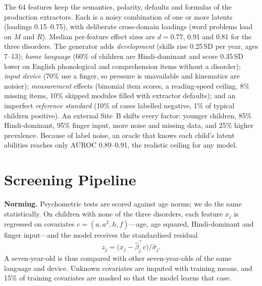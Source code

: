 \documentclass[conference]{IEEEtran}
\begin{document}
The 64 features keep the semantics, polarity, defaults and formulas of the production extractors. Each is a noisy combination of one or more latents (loadings 0.15--0.75), with deliberate cross-domain loadings (word problems load on $M$ and $R$). Median per-feature effect sizes are $d{=}0.77$, 0.91 and 0.81 for the three disorders. The generator adds \emph{development} (skills rise 0.25\,SD per year, ages 7--13); \emph{home language} (60\% of children are Hindi-dominant and score 0.35\,SD lower on English phonological and comprehension items without a disorder); \emph{input device} (70\% use a finger, so pressure is unavailable and kinematics are noisier); \emph{measurement} effects (binomial item scores, a reading-speed ceiling, 8\% missing items, 10\% skipped modules filled with extractor defaults); and an imperfect \emph{reference standard} (10\% of cases labelled negative, 1\% of typical children positive). An external Site~B shifts every factor: younger children, 85\% Hindi-dominant, 95\% finger input, more noise and missing data, and 25\% higher prevalence. Because of label noise, an oracle that knows each child's latent abilities reaches only AUROC 0.89--0.91, the realistic ceiling for any model.

\section{Screening Pipeline}\label{sec:pipeline}
\textbf{Norming.} Psychometric tests are scored against age norms; we do the same statistically. On children with none of the three disorders, each feature $x_j$ is regressed on covariates $c=(a,a^2,h,f)$---age, age squared, Hindi-dominant and finger input---and the model receives the standardised residual
\begin{equation}
z_j = \bigl(x_j - \hat\beta_j^{\top} c\bigr)/\hat\sigma_j .
\end{equation}
A seven-year-old is thus compared with other seven-year-olds of the same language and device. Unknown covariates are imputed with training means, and 15\% of training covariates are masked so that the model learns that case.
\end{document}

